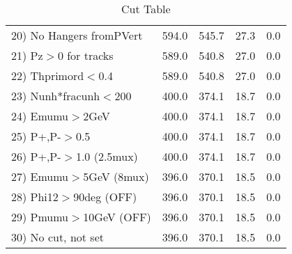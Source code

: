 \begin{table}[h!]
\begin{tabular}{||l||r|r|r|r||}
 20) No Hangers fromPVert &       594.0 &       545.7 &        27.3 &         0.0 \\
 21) Pz$>$0 for tracks    &       589.0 &       540.8 &        27.0 &         0.0 \\
 22) Thprimord$<$0.4      &       589.0 &       540.8 &        27.0 &         0.0 \\
 23) Nunh*fracunh$<$200   &       400.0 &       374.1 &        18.7 &         0.0 \\
 24) Emumu$>$2GeV         &       400.0 &       374.1 &        18.7 &         0.0 \\
 25) P+,P-$>$0.5          &       400.0 &       374.1 &        18.7 &         0.0 \\
 26) P+,P-$>$1.0 (2.5mux) &       400.0 &       374.1 &        18.7 &         0.0 \\
 27) Emumu$>$5GeV  (8mux) &       396.0 &       370.1 &        18.5 &         0.0 \\
 28) Phi12$>$90deg  (OFF) &       396.0 &       370.1 &        18.5 &         0.0 \\
 29) Pmumu$>$10GeV  (OFF) &       396.0 &       370.1 &        18.5 &         0.0 \\
 30) No cut, not set      &       396.0 &       370.1 &        18.5 &         0.0 \\
 \hline
 \hline
 \end{tabular}
 \caption{Cut Table \cohrp  }
 \label{tab-cut_crhop}
 \end{table}
